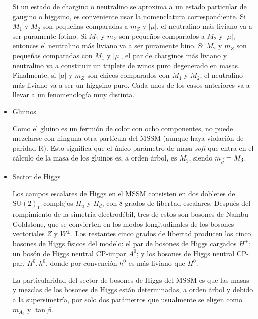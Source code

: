 \begin{itemize}

Si un estado de chargino o neutralino se aproxima a un estado particular de
gaugino o higgsino, es conveniente usar la nomenclatura correspondiente. Si
$M_1$ y $M_2$ son pequeñas comparadas a $m_Z$ y $|\mu|$, el neutralino más
liviano va a ser puramente fotino. Si $M_1$ y $m_Z$ son pequeños comparados a
$M_2$ y $|\mu|$, entonces el neutralino más liviano va a ser puramente bino. Si
$M_2$ y $m_Z$ son pequeñas comparadas con $M_1$ y $|\mu|$, el par de charginos
más liviano y neutralino va a constituir un triplete de winos puro degenerado en
masas. Finalmente, si $|\mu|$ y $m_Z$ son chicos comparados con $M_1$ y $M_2$,
el neutralino más liviano va a ser un higgsino puro. Cada unos de los casos
anteriores va a llevar a un fenomenología muy distinta.


\item Gluinos

Como el gluino es un fermión de color con ocho componentes, no puede mezclarse con ninguna
otra partícula del MSSM (aunque haya violación de paridad-R). Esto significa que el único
parámetro de masa \emph{soft} que entra en el cálculo de la masa de los gluinos es, a
orden árbol, es $M_3$, siendo $m_{\widetilde{g}} = M_3$.


\item Sector de Higgs

  Los campos escalares de Higgs en el MSSM consisten en dos dobletes de
  $\text{SU}(2)_\text{L}$ complejos $H_u$ y $H_d$, con 8 grados de libertad
  escalares. Después del rompimiento de la simetría electrodébil, tres de estos
  son bosones de Nambu-Goldstone, que se convierten en los modos longitudinales de
  los bosones vectoriales $Z$ y $W^\pm$. Los restantes cinco grados de libertad
  producen los cinco bosones de Higgs físicos del modelo: el par de bosones de
  Higgs cargados $H^\pm$; un bosón de Higgs neutral CP-impar $A^0$; y los bosones
  de Higgs neutral CP-par, $H^0,h^0$, donde por convención $h^0$ es más liviano
  que $H^0$.

  La particularidad del sector de bosones de Higgs del MSSM es que las masas y mezclas
  de los bosones de Higgs están determinadas, a orden árbol y debido a la supersimetría,
  por solo dos parámetros que usualmente se eligen como $m_{A_0}$ y $\tan \beta$.


\end{itemize}


